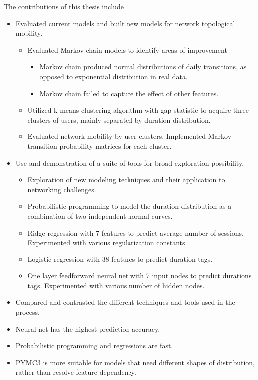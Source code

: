 \documentclass[]{article}
\begin{document}
The contributions of this thesis include 
\begin{itemize}
\item
Evaluated current models and built new models for network topological mobility.
\begin{itemize}
\item
Evaluated Markov chain models to identify areas of improvement
\begin{itemize}
\item
Markov chain produced normal distributions of daily transitions, as opposed to exponential distribution in real data.
\item
Markov chain failed to capture the effect of other features.
\end{itemize}
\item
Utilized k-means clustering algorithm with gap-statistic to acquire three clusters of users, mainly separated by duration distribution.
\item
Evaluated network mobility by user clusters. Implemented Markov transition probability matrices for each cluster.
\end{itemize}
\item
Use and demonstration of a suite of tools for broad exploration possibility.
\begin{itemize}
\item
Exploration of new modeling techniques and their application to networking challenges.
\item
Probabilistic programming to model the duration distribution as a combination of two independent normal curves.
\item
Ridge regression with 7 features to predict average number of sessions. Experimented with various regularization constants.
\item
Logistic regression with 38 features to predict duration tags.
\item
One layer feedforward neural net with 7 input nodes to predict durations tags. Experimented with various number of hidden nodes. 
\end{itemize}
\item
Compared and contrasted the different techniques and tools used in the process.
\item
Neural net has the highest prediction accuracy.
\item
Probabilistic programming and regressions are fast.
\item
PYMC3 is more suitable for models that need different shapes of distribution, rather than resolve feature dependency.
\end{itemize}
\end{document}
